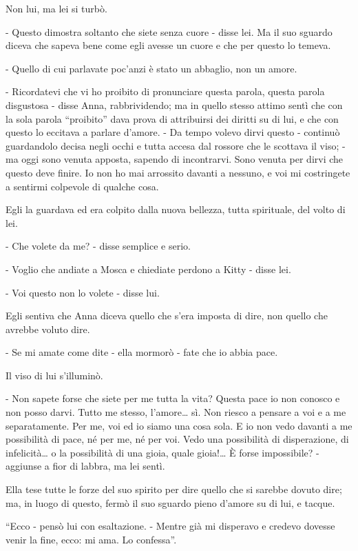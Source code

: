 Non lui, ma lei si turbò. 

- Questo dimostra soltanto che siete senza cuore - disse lei. Ma il suo sguardo diceva che sapeva bene come egli avesse un cuore e che per questo lo temeva. 

- Quello di cui parlavate poc'anzi è stato un abbaglio, non un amore. 

- Ricordatevi che vi ho proibito di pronunciare questa parola, questa parola disgustosa - disse Anna, rabbrividendo; ma in quello stesso attimo sentì che con la sola parola ``proibito'' dava prova di attribuirsi dei diritti su di lui, e che con questo lo eccitava a parlare d'amore. - Da tempo volevo dirvi questo - continuò guardandolo decisa negli occhi e tutta accesa dal rossore che le scottava il viso; - ma oggi sono venuta apposta, sapendo di incontrarvi. Sono venuta per dirvi che questo deve finire. Io non ho mai arrossito davanti a nessuno, e voi mi costringete a sentirmi colpevole di qualche cosa. 

Egli la guardava ed era colpito dalla nuova bellezza, tutta spirituale, del volto di lei. 

- Che volete da me? - disse semplice e serio. 

- Voglio che andiate a Mosca e chiediate perdono a Kitty - disse lei. 

- Voi questo non lo volete - disse lui. 

Egli sentiva che Anna diceva quello che s'era imposta di dire, non quello che avrebbe voluto dire. 

- Se mi amate come dite - ella mormorò - fate che io abbia pace. 

Il viso di lui s'illuminò. 

- Non sapete forse che siete per me tutta la vita? Questa pace io non conosco e non posso darvi. Tutto me stesso, l'amore\ldots{} sì. Non riesco a pensare a voi e a me separatamente. Per me, voi ed io siamo una cosa sola. E io non vedo davanti a me possibilità di pace, né per me, né per voi. Vedo una possibilità di disperazione, di infelicità\ldots{} o la possibilità di una gioia, quale gioia!\ldots{} È forse impossibile? - aggiunse a fior di labbra, ma lei sentì. 

Ella tese tutte le forze del suo spirito per dire quello che si sarebbe dovuto dire; ma, in luogo di questo, fermò il suo sguardo pieno d'amore su di lui, e tacque. 

``Ecco - pensò lui con esaltazione. - Mentre già mi disperavo e credevo dovesse venir la fine, ecco: mi ama. Lo confessa''. 

